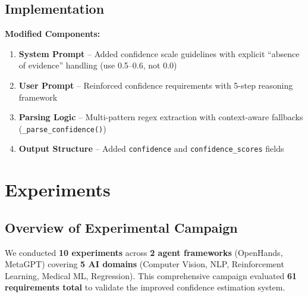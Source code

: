 \documentclass[11pt,a4paper]{article}
\begin{document}
\subsection{Implementation}

\textbf{Modified Components:}
\begin{enumerate}[leftmargin=*]
    \item \textbf{System Prompt} -- Added confidence scale guidelines with explicit ``absence of evidence'' handling (use 0.5--0.6, not 0.0)
    \item \textbf{User Prompt} -- Reinforced confidence requirements with 5-step reasoning framework
    \item \textbf{Parsing Logic} -- Multi-pattern regex extraction with context-aware fallbacks (\texttt{\_parse\_confidence()})
    \item \textbf{Output Structure} -- Added \texttt{confidence} and \texttt{confidence\_scores} fields
\end{enumerate}

\section{Experiments}

\subsection{Overview of Experimental Campaign}

We conducted \textbf{10 experiments} across \textbf{2 agent frameworks} (OpenHands, MetaGPT) covering \textbf{5 AI domains} (Computer Vision, NLP, Reinforcement Learning, Medical ML, Regression). This comprehensive campaign evaluated \textbf{61 requirements total} to validate the improved confidence estimation system.
\end{document}

